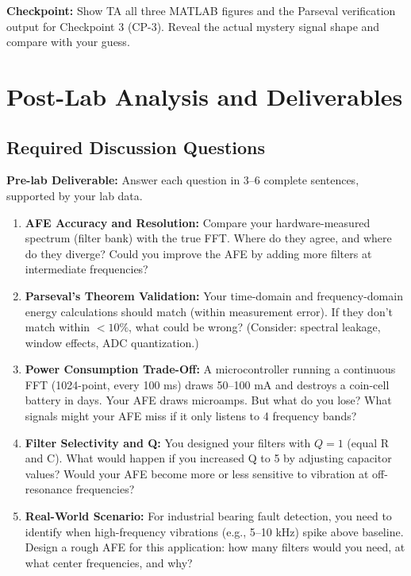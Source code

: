 \documentclass[11pt,letterpaper]{article}
\providecommand{\pldECE}[1]{\textcolor{BrickRed}{\textbf{Pre-lab Deliverable:} #1}}
\providecommand{\cpECE}[1]{\textcolor{OliveGreen}{\textbf{Checkpoint:} #1}}
\begin{document}
\cpECE{Show TA all three MATLAB figures and the Parseval verification output for Checkpoint 3 (CP-3). Reveal the actual mystery signal shape and compare with your guess.}

\clearpage

\section{Post-Lab Analysis and Deliverables}

\subsection{Required Discussion Questions}

\pldECE{Answer each question in 3--6 complete sentences, supported by your lab data.}

\begin{enumerate}
    \item \textbf{AFE Accuracy and Resolution:} Compare your hardware-measured spectrum (filter bank) with the true FFT. Where do they agree, and where do they diverge? Could you improve the AFE by adding more filters at intermediate frequencies?

    \item \textbf{Parseval's Theorem Validation:} Your time-domain and frequency-domain energy calculations should match (within measurement error). If they don't match within $< 10\%$, what could be wrong? (Consider: spectral leakage, window effects, ADC quantization.)

    \item \textbf{Power Consumption Trade-Off:} A microcontroller running a continuous FFT (1024-point, every 100 ms) draws 50--100 mA and destroys a coin-cell battery in days. Your AFE draws microamps. But what do you lose? What signals might your AFE miss if it only listens to 4 frequency bands?

    \item \textbf{Filter Selectivity and Q:} You designed your filters with $Q = 1$ (equal R and C). What would happen if you increased Q to 5 by adjusting capacitor values? Would your AFE become more or less sensitive to vibration at off-resonance frequencies?

    \item \textbf{Real-World Scenario:} For industrial bearing fault detection, you need to identify when high-frequency vibrations (e.g., 5--10 kHz) spike above baseline. Design a rough AFE for this application: how many filters would you need, at what center frequencies, and why?
\end{enumerate}
\end{document}

